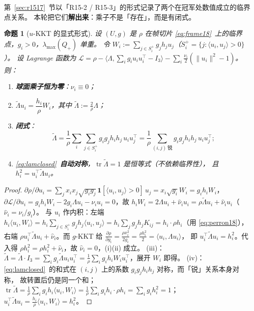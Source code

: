 \documentclass[UTF8,11pt]{ctexart}
\newtheorem{proposition}[theorem]{命题}
\theoremstyle{definition}
\newcommand{\Lam}{\Lambda}
\newcommand{\tr}{\operatorname{tr}}
\newcommand{\one}{\mathbf{1}}
\begin{document}
第~\ref{sec:r1517}~节以「R15-2 / R15-3」的形式记录了两个在冠军处数值成立的临界点关系。
本轮把它们\textbf{解出来}：乘子不是「存在」，而是有闭式。

\begin{proposition}[$u$-KKT 的显式形式]\label{prop:uktkt}
设 $(U,g)$ 是 $\rho$ 在帧切片 \eqref{eq:frame18}~上的临界点，$g_i>0$，$\lambda_{\max}(Q_+)$ 单重。
令 $W_i:=\sum_{j\in S_i^+}g_jh_ju_j$（$S_i^+=\{j:\langle u_i,u_j\rangle>0\}$）。
设 Lagrange 函数为
$\mathcal L=\rho-\langle\Lam,\sum_ig_iu_iu_i^\top-I_3\rangle-\sum_i\frac{\nu_i}2(\|u_i\|^2-1)$。
则：
\begin{enumerate}\itemsep2pt
\item[(i)] \textbf{球面乘子恒为零}：$\nu_i\equiv0$；
\item[(ii)] $\tilde\Lam u_i=\dfrac{h_i}{\rho}W_i$，其中 $\tilde\Lam:=\frac2\rho\Lam$；
\item[(iii)] \textbf{闭式}：
\begin{equation}\label{eq:lamclosed}
\tilde\Lam=\frac1\rho\sum_{i}\sum_{j\in S_i^+}g_ig_jh_ih_j\,u_iu_j^\top
=\frac1\rho\sum_{(i,j)\ \text{锐}}g_ig_jh_ih_j\,u_iu_j^\top ;
\end{equation}
\item[(iv)] \eqref{eq:lamclosed}~\textbf{自动对称}，$\tr\tilde\Lam=1$ 是恒等式（不依赖临界性），
且 $h_i^2=u_i^\top\tilde\Lam u_i$。
\end{enumerate}
\end{proposition}

\begin{proof}
$\partial\rho/\partial u_i=\sum_jx_ix_j\sqrt{g_ig_j}\,\one[\langle u_i,u_j\rangle>0]\,u_j
=x_i\sqrt{g_i}W_i=g_ih_iW_i$，
$\partial\mathcal L/\partial u_i=g_ih_iW_i-2g_i\Lam u_i-\nu_iu_i=0$，故
$h_iW_i=2\Lam u_i+\hat\nu_iu_i=\rho\tilde\Lam u_i+\hat\nu_iu_i$（$\hat\nu_i=\nu_i/g_i$）。
与 $u_i$ 作内积：左端 $h_i\langle u_i,W_i\rangle=h_i\sum_{j\in S_i^+}g_jh_j\langle u_i,u_j\rangle
=h_i\sum_jg_jh_jK_{ij}=h_i\cdot\rho h_i$（用 \eqref{eq:perron18}），
右端 $\rho u_i^\top\tilde\Lam u_i+\hat\nu_i$。而 $g$-KKT 给
$\frac{\partial\rho}{\partial g_i}=\frac{\rho x_i^2}{2g_i}=\frac{\rho h_i^2}2=\langle u_i,\Lam u_i\rangle$，
即 $u_i^\top\tilde\Lam u_i=h_i^2$。代入得 $\rho h_i^2=\rho h_i^2+\hat\nu_i$，故 $\hat\nu_i=0$，(i)(ii) 成立。
(iii)：$\tilde\Lam=\tilde\Lam\cdot I_3=\sum_ig_i\tilde\Lam u_iu_i^\top=\frac1\rho\sum_ig_ih_iW_iu_i^\top$，展开 $W_i$ 即得。
(iv)：\eqref{eq:lamclosed}~的和式在 $(i,j)$ 上的系数 $g_ig_jh_ih_j$ 对称，而「锐」关系本身对称，
故转置后仍是同一个和；$\tr\tilde\Lam=\frac1\rho\sum_ig_ih_i\langle u_i,W_i\rangle
=\frac1\rho\sum_ig_ih_i\cdot\rho h_i=\sum_ig_ih_i^2=1$；
$u_i^\top\tilde\Lam u_i=\frac{h_i}{\rho}\langle u_i,W_i\rangle=h_i^2$。
\end{proof}
\end{document}
